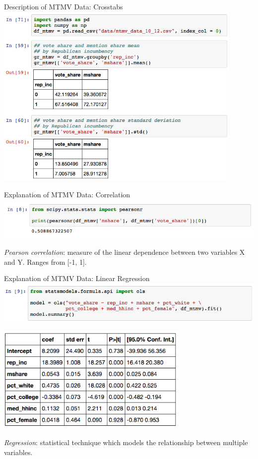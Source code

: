 \documentclass{beamer}
\begin{document}
\begin{frame}{Description of MTMV Data: Crosstabs}
    \includegraphics[width=0.9\textwidth]{img/mtmv-meansd.png}
\end{frame}

\begin{frame}{Explanation of MTMV Data: Correlation}
    \includegraphics[width=\textwidth]{img/mtmv-correlation.png}

    \vspace*{1em}

    \textit{Pearson correlation}: measure of the linear dependence between two variables X and Y. Ranges from [-1, 1].
\end{frame}

\begin{frame}{Explanation of MTMV Data: Linear Regression}
    \includegraphics[width=\textwidth]{img/mtmv-ols-1.png}

    \includegraphics[width=0.7\textwidth]{img/mtmv-ols-2.png}

    \textit{Regression}: statistical technique which models the relationship between multiple variables.
\end{frame}
\end{document}
